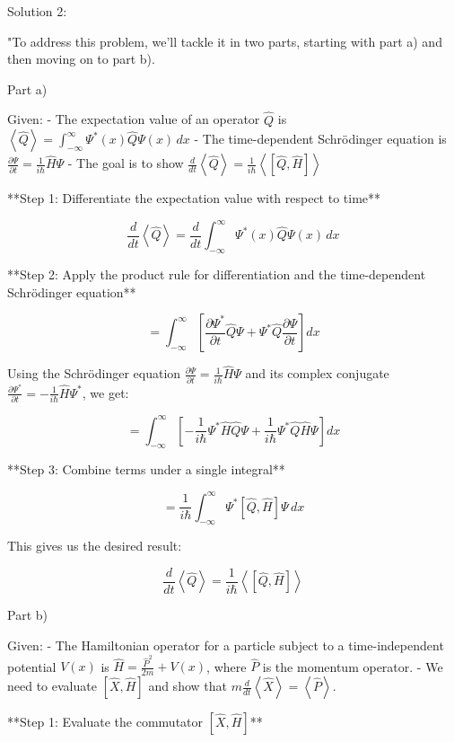 Solution 2:

"To address this problem, we'll tackle it in two parts, starting with part a) and then moving on to part b).

Part a)

Given:
- The expectation value of an operator \( \hat{Q} \) is \( \left< \hat{Q} \right> = \int_{-\infty}^{\infty} \Psi^{*}(x) \hat{Q} \Psi(x) \, dx \)
- The time-dependent Schrödinger equation is \( \frac{\partial\Psi}{\partial t} = \frac{1}{i\hbar}\hat{H}\Psi \)
- The goal is to show \( \frac{d}{dt}\left<\hat{Q}\right> = \frac{1}{i\hbar}\left< \left[ \hat{Q}, \hat{H} \right] \right> \)

**Step 1: Differentiate the expectation value with respect to time**

\[
\frac{d}{dt}\left<\hat{Q}\right> = \frac{d}{dt}\int_{-\infty}^{\infty} \Psi^{*}(x) \hat{Q} \Psi(x) \, dx
\]

**Step 2: Apply the product rule for differentiation and the time-dependent Schrödinger equation**

\[
= \int_{-\infty}^{\infty} \left[ \frac{\partial \Psi^{*}}{\partial t} \hat{Q} \Psi + \Psi^{*} \hat{Q} \frac{\partial \Psi}{\partial t} \right] dx
\]

Using the Schrödinger equation \( \frac{\partial\Psi}{\partial t} = \frac{1}{i\hbar}\hat{H}\Psi \) and its complex conjugate \( \frac{\partial\Psi^{*}}{\partial t} = -\frac{1}{i\hbar}\hat{H}\Psi^{*} \), we get:

\[
= \int_{-\infty}^{\infty} \left[ -\frac{1}{i\hbar} \Psi^{*} \hat{H} \hat{Q} \Psi + \frac{1}{i\hbar} \Psi^{*} \hat{Q} \hat{H} \Psi \right] dx
\]

**Step 3: Combine terms under a single integral**

\[
= \frac{1}{i\hbar} \int_{-\infty}^{\infty} \Psi^{*} \left[ \hat{Q}, \hat{H} \right] \Psi \, dx
\]

This gives us the desired result:

\[
\frac{d}{dt}\left<\hat{Q}\right> = \frac{1}{i\hbar}\left< \left[ \hat{Q}, \hat{H} \right] \right>
\]

Part b)

Given:
- The Hamiltonian operator for a particle subject to a time-independent potential \( V(x) \) is \( \hat{H} = \frac{\hat{P}^2}{2m} + V(x) \), where \( \hat{P} \) is the momentum operator.
- We need to evaluate \( \left[ \hat{X}, \hat{H}\right] \) and show that \( m\frac{d}{dt}\left<\hat{X}\right> = \left<\hat{P}\right> \).

**Step 1: Evaluate the commutator \(\left[ \hat{X}, \hat{H}\right]\)**

